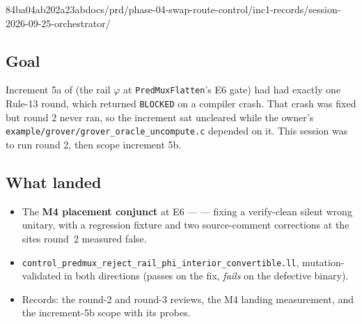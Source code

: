 %
  {84ba04ab}{202a23ab}{docs/prd/phase-04-swap-route-control/inc1-records/session-2026-09-25-orchestrator/}

\subsection*{Goal}
Increment 5a of  (the rail \(\varphi\) at \texttt{PredMuxFlatten}'s
E6 gate) had had exactly one Rule-13 round, which returned \texttt{BLOCKED} on a compiler
crash. That crash was fixed but round 2 never ran, so the increment sat uncleared while the
owner's \texttt{example/grover/grover\_oracle\_uncompute.c} depended on it. This session was
to run round 2, then scope increment 5b.

\subsection*{What landed}
\begin{itemize}
  \item The \textbf{M4 placement conjunct} at E6 ---  --- fixing a
        verify-clean silent wrong unitary, with a regression fixture and two source-comment
        corrections at the sites round~2 measured false.
  \item \texttt{control\_predmux\_reject\_rail\_phi\_interior\_convertible.ll}, mutation-validated
        in both directions (passes on the fix, \emph{fails} on the defective binary).
  \item Records: the round-2 and round-3 reviews, the M4 landing measurement, and the
        increment-5b scope with its probes.
\end{itemize}

